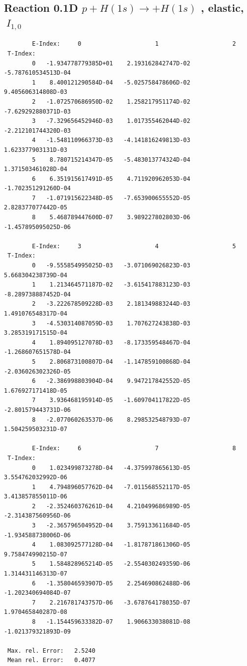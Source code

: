 \documentclass[12pt,dvips]{article}
\begin{document}
\subsection{
Reaction 0.1D  $p + H(1s) \rightarrow  + H(1s)$ ,
elastic, $\ I_{1,0}$
}

\begin{small}\begin{verbatim}
        E-Index:     0                     1                     2
 T-Index:
        0   -1.934778779385D+01    2.193162842747D-02   -5.787610534513D-04
        1    8.400121290584D-04   -5.025758478606D-02    9.405606314808D-03
        2   -1.072570686950D-02    1.258217951174D-02   -7.629292880371D-03
        3   -7.329656452946D-03    1.017355462044D-02   -2.212101744320D-03
        4   -1.548110966373D-03   -4.141816249813D-03    1.623377903131D-03
        5    8.780715214347D-05   -5.483013774324D-04    1.371503461028D-04
        6    6.351915617491D-05    4.711920962053D-04   -1.702351291260D-04
        7   -1.071915622348D-05   -7.653900655552D-05    2.828377077442D-05
        8    5.468789447600D-07    3.989227802803D-06   -1.457895095025D-06

        E-Index:     3                     4                     5
 T-Index:
        0   -9.555854995025D-03   -3.071069026823D-03    5.668304238739D-04
        1    1.213464571187D-02   -3.615417883123D-03   -8.289738887452D-04
        2   -3.222678509228D-03    2.181349883244D-03    1.491076548317D-04
        3   -4.530314087059D-03    1.707627243838D-03    3.285319171515D-04
        4    1.894095127078D-03   -8.173359548467D-04   -1.268607651578D-04
        5    2.806873100807D-04   -1.147859100868D-04   -2.036026302326D-05
        6   -2.386998803904D-04    9.947217842552D-05    1.676927171418D-05
        7    3.936468195914D-05   -1.609704117822D-05   -2.801579443731D-06
        8   -2.077060263537D-06    8.298532548793D-07    1.504259503231D-07

        E-Index:     6                     7                     8
 T-Index:
        0    1.023499873278D-04   -4.375997865613D-05    3.554762032992D-06
        1    4.794896057762D-04   -7.011568552117D-05    3.413857855011D-06
        2   -2.352460376261D-04    4.210499686989D-05   -2.314387560956D-06
        3   -2.365796504952D-04    3.759133611684D-05   -1.934588738006D-06
        4    1.083092577128D-04   -1.817871861306D-05    9.758474990215D-07
        5    1.584828965214D-05   -2.554030249359D-06    1.314431146313D-07
        6   -1.358046593907D-05    2.254690862488D-06   -1.202340694084D-07
        7    2.216781743757D-06   -3.678764178035D-07    1.970465840287D-08
        8   -1.154459633382D-07    1.906633038081D-08   -1.021379321893D-09

 Max. rel. Error:   2.5240
 Mean rel. Error:   0.4077
\end{verbatim}\end{small}
\end{document}

